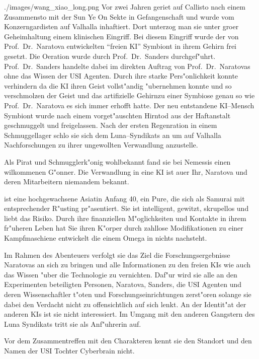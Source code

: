 \begin{sideimagebox}[r]{0.61}{./images/wang_xiao_long.png}{}
    Vor zwei Jahren geriet \xl{} auf Callisto nach einem Zusammensto\3 mit der Sun Ye On Sekte in Gefangenschaft und wurde vom Konzerngardisten auf Valhalla inhaftiert. Dort unterzog man sie unter gro\3er Geheimhaltung einem klinischen Eingriff. Bei diesem Eingriff wurde der von Prof.~Dr.~Naratova entwickelten ``freien KI'' Symbiont in ihrem Gehirn frei gesetzt. Die Oeration wurde durch Prof.~Dr.~Sanders durchgef"uhrt. Prof.~Dr.~Sanders handelte dabei im direkten Auftrag von Prof.~Dr.~Naratovas ohne das Wissen der USI Agenten. Durch ihre starke Pers"onlichkeit konnte \xl{} verhindern da\3 die KI ihren Geist vollst"andig "ubernehmen konnte und so verschmolzen der Geist und das artifizielle Gehirnzu einer Symbiose genau so wie Prof.~Dr.~Naratova es sich immer erhofft hatte. Der neu entstandene KI--Mensch Symbiont wurde nach einem vorget"auschten Hirntod aus der Haftanstalt geschmuggelt und freigelassen. 
    Nach der ersten Regenration in einem Schmuggellager schlo\3 sie sich \xl{} dem Luna--Syndikats an um auf Valhalla Nachforschungen zu ihrer ungewollten Verwandlung anzustelle.

    Als Pirat und Schmugglerk"onig wohlbekannt fand sie bei Nemessis einen wilkommenen G"onner. Die Verwandlung in eine KI ist au\3er Ihr, Naratova und deren Mitarbeitern niemandem bekannt.
\end{sideimagebox}

\xl{} ist eine hochgewachsene Asiatin Anfang 40, ein Pure, die sich als Samurai mit entsprechender R"usting pr"asentiert. Sie ist intelligent, gewitzt, skrupellos und liebt das Risiko. Durch ihre finanziellen M"oglichkeiten und Kontakte in ihrem fr"uheren Leben hat Sie ihren K"orper durch zahllose Modifikationen zu einer Kampfmaschiene entwickelt die einem Omega in nichts nachsteht.

Im Rahmen des Abenteuers verfolgt sie das Ziel die Forschungsergebnisse Naratovas an sich zu bringen und alle Informationen zu den freien KIs wie auch das Wissen "uber die Technologie zu vernichten. Daf"ur wird sie alle an den Experimenten beteiligten Personen, Naratova, Sanders, die USI Agenten und deren Wissenschaftler t"oten und Forschungseinrichtungen zerst"oren solange sie dabei den Verdacht nicht zu offensichtlich auf sich lenkt. An der Identit"at der anderen KIs ist sie nicht interessiert. Im Umgang mit den anderen  Gangstern des Luna Syndikats tritt sie als Anf"uhrerin auf.

Vor dem Zusammentreffen mit den Charakteren kennt sie den Standort und den Namen der USI Tochter Cyberbrain nicht.

